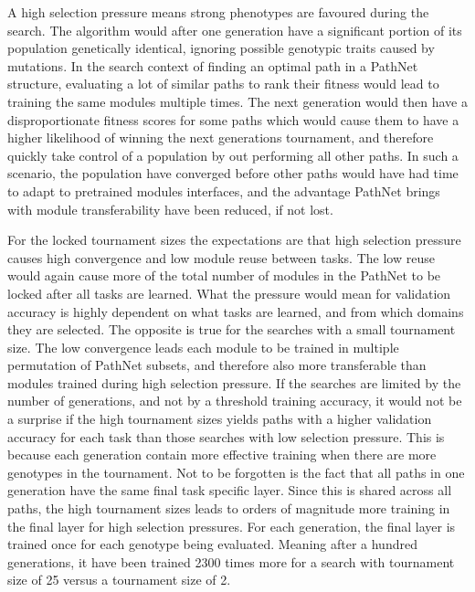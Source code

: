 A high selection pressure means strong phenotypes are favoured during the search. The algorithm would after one generation have a significant portion of its population genetically identical, ignoring possible genotypic traits caused by mutations. In the search context of finding an optimal path in a PathNet structure, evaluating a lot of similar paths to rank their fitness would lead to training the same modules multiple times. The next generation would then have a disproportionate fitness scores for some paths which would cause them to have a higher likelihood of winning the next generations tournament, and therefore quickly take control of a population by out performing all other paths. In such a scenario, the population have converged before other paths would have had time to adapt to pretrained modules interfaces, and the advantage PathNet brings with module transferability have been reduced, if not lost.  

For the locked tournament sizes the expectations are that high selection pressure causes high convergence and low module reuse between tasks. The low reuse would again cause more of the total number of modules in the PathNet to be locked after all tasks are learned. What the pressure would mean for validation accuracy is highly dependent on what tasks are learned, and from which domains they are selected. 
The opposite is true for the searches with a small tournament size. The low convergence leads each module to be trained in multiple permutation of PathNet subsets, and therefore also more transferable than modules trained during high selection pressure. If the searches are limited by the number of generations, and not by a threshold training accuracy, it would not be a surprise if the high tournament sizes yields paths with a higher validation accuracy for each task than those searches with low selection pressure. This is because each generation contain more effective training when there are more genotypes in the tournament. 
Not to be forgotten is the fact that all paths in one generation have the same final task specific layer.  Since this is shared across all paths, the high tournament sizes leads to orders of magnitude more training in the final layer for high selection pressures. For each generation, the final layer is trained once for each genotype being evaluated. Meaning after a hundred generations, it have been trained 2300 times more for a search with tournament size of 25 versus a tournament size of 2. 


